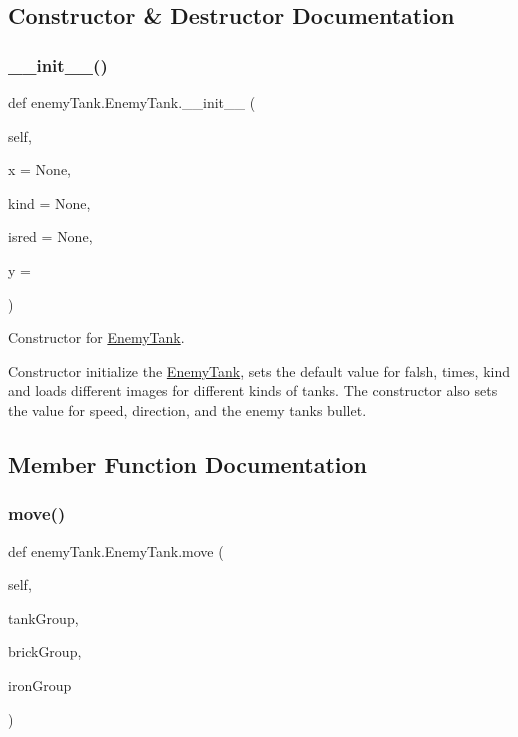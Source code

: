 \subsection{Constructor \& Destructor Documentation}
\mbox{\label{classenemy_tank_1_1_enemy_tank_a7be7fa26f9a80b3d4a6af7ef5c6871d9}} 
\subsubsection{\texorpdfstring{\_\_init\_\_()}{\_\_init\_\_()}}
{\footnotesize\ttfamily def enemy\+Tank.\+Enemy\+Tank.\+\_\+\+\_\+init\+\_\+\+\_\+ (\begin{DoxyParamCaption}\item[{}]{self,  }\item[{}]{x = {\ttfamily None},  }\item[{}]{kind = {\ttfamily None},  }\item[{}]{isred = {\ttfamily None},  }\item[{}]{y = {} }\end{DoxyParamCaption})}



Constructor for \mbox{\hyperlink{classenemy_tank_1_1_enemy_tank}{Enemy\+Tank}}. 

Constructor initialize the \mbox{\hyperlink{classenemy_tank_1_1_enemy_tank}{Enemy\+Tank}}, sets the default value for falsh, times, kind and loads different images for different kinds of tanks. The constructor also sets the value for speed, direction, and the enemy tank\textquotesingle{}s bullet. 

\subsection{Member Function Documentation}
\mbox{\label{classenemy_tank_1_1_enemy_tank_ac00e5c1dbaae2fc25ce84d085fd82402}} 
\subsubsection{\texorpdfstring{move()}{move()}}
{\footnotesize\ttfamily def enemy\+Tank.\+Enemy\+Tank.\+move (\begin{DoxyParamCaption}\item[{}]{self,  }\item[{}]{tank\+Group,  }\item[{}]{brick\+Group,  }\item[{}]{iron\+Group }\end{DoxyParamCaption})}



